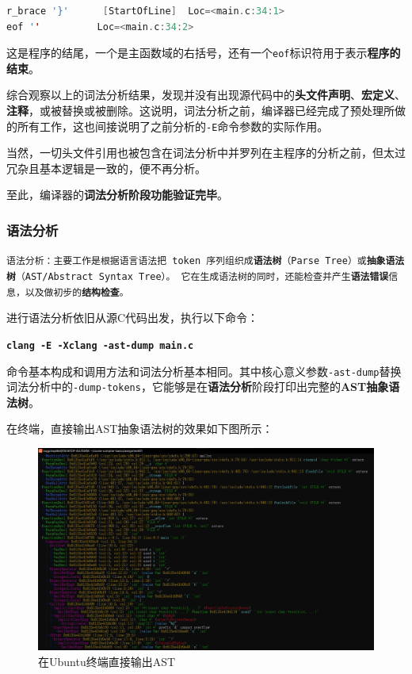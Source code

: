\documentclass[UTF8,a4paper,10pt]{ctexart}
\begin{document}
\vspace{1em}


\begin{lstlisting}[title=词法分析片段 8,frame=trbl,language={C++}]
r_brace '}'      [StartOfLine]  Loc=<main.c:34:1>
eof ''          Loc=<main.c:34:2>
\end{lstlisting}

这是程序的结尾，一个是主函数域的右括号，还有一个\texttt{eof}标识符用于表示\textbf{程序的结束}。

\vspace{1em}

综合观察以上的词法分析结果，发现并没有出现源代码中的\textbf{头文件声明}、\textbf{宏定义}、\textbf{注释}，或被替换或被删除。这说明，词法分析之前，编译器已经完成了预处理所做的所有工作，这也间接说明了之前分析的\texttt{-E}命令参数的实际作用。

当然，一切头文件引用也被包含在词法分析中并罗列在主程序的分析之前，但太过冗杂且基本逻辑是一致的，便不再分析。

\vspace{1em}

至此，编译器的\textbf{词法分析阶段功能验证完毕}。

\subsubsection{语法分析}
\texttt{\large{语法分析：主要工作是根据语言语法把 token 序列组织成\textbf{语法树}（Parse Tree）或\textbf{抽象语法树}（AST/Abstract Syntax Tree）。
它在生成语法树的同时，还能检查并产生\textbf{语法错误}信息，以及做初步的\textbf{结构检查}。}}

\vspace{1em}

进行语法分析依旧从源C代码出发，执行以下命令：
\begin{center}
    \textcolor{deepblue}{\textbf{\texttt{\large{clang -E -Xclang -ast-dump main.c}}}}
\end{center}

命令基本构成和调用方法和词法分析基本相同。其中核心意义参数\texttt{-ast-dump}替换词法分析中的\texttt{-dump-tokens}，它能够是在\textbf{语法分析}阶段打印出完整的\textbf{AST抽象语法树}。

在终端，直接输出AST抽象语法树的效果如下图所示：
\begin{figure} [H]
    \centering
    \includegraphics[width=0.9\linewidth]{ccl_1.png}
    \caption{在Ubuntu终端直接输出AST}
    \label{fig:placeholder}
\end{figure}
\end{document}
